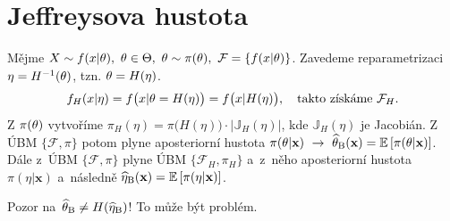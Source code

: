 \section{Jeffreysova hustota}
	Mějme $X\sim f(x|\theta),~\theta\in\Theta,~\theta\sim\pi(\theta),~\mathcal{F}=\{f(x|\theta)\}$. Zavedeme reparametrizaci $\eta=H^{-1}(\theta)$, tzn. $\theta=H(\eta)$. 
	$$ f_H(x|\eta)=f\big(x|\theta=H(\eta)\big)=f\big(x|H(\eta)\big),\quad\text{takto získáme }\mathcal{F}_H.$$
	Z $\pi(\theta)$ vytvoříme $\pi_H(\eta)=\pi\big(H(\eta)\big)\cdot\big|\mathbb{J}_H(\eta)\big|$, kde  $\mathbb{J}_H(\eta)$ je Jacobián.
	Z ÚBM $\{\mathcal{F},\pi\}$ potom plyne aposteriorní hustota $\pi(\theta|\textbf{x})~\to~\widehat{\theta}_\mathrm{B}(\textbf{x})=\mathbb{E}\left[ \pi(\theta|\textbf{x}) \right]$. Dále z~ÚBM $\{\mathcal{F},\pi\}$ plyne ÚBM $\{\mathcal{F}_H,\pi_H\}$ a~z~něho aposteriorní hustota $\pi(\eta|\textbf{x})$ a~následně $ \widehat{\eta}_\mathrm{B}(\textbf{x})=\mathbb{E}\left[ \pi(\eta|\textbf{x}) \right]$. 
	
	Pozor na~$\widehat{\theta}_\mathrm{B}\neq H(\widehat{\eta}_\mathrm{B})$! To může být problém.
	
